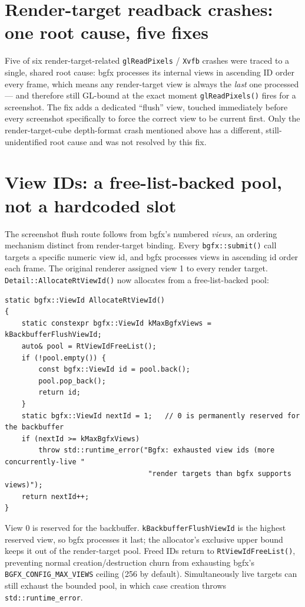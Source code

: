 \section{Render-target readback crashes: one root cause, five fixes}

Five of six render-target-related \texttt{glReadPixels} / \texttt{Xvfb} crashes were traced to
a single, shared root cause: bgfx processes its internal views in ascending ID order every
frame, which means any render-target view is always the \emph{last} one processed --- and
therefore still GL-bound at the exact moment \texttt{glReadPixels()} fires for a screenshot.
The fix adds a dedicated ``flush'' view, touched immediately before every screenshot
specifically to force the correct view to be current first. Only the render-target-cube
depth-format crash mentioned above has a different, still-unidentified root cause and was
not resolved by this fix.

\section{View IDs: a free-list-backed pool, not a hardcoded slot}
\label{sec:bgfx-view-ids}

The screenshot flush route follows from bgfx's numbered \emph{views}, an ordering mechanism
distinct from render-target binding. Every
\texttt{bgfx::submit()} call targets a specific numeric view id, and bgfx processes views in
ascending id order each frame. The original renderer assigned view 1 to every render target.
\texttt{Detail::AllocateRtViewId()} now allocates from a free-list-backed pool:

\begin{lstlisting}
static bgfx::ViewId AllocateRtViewId()
{
    static constexpr bgfx::ViewId kMaxBgfxViews = kBackbufferFlushViewId;
    auto& pool = RtViewIdFreeList();
    if (!pool.empty()) {
        const bgfx::ViewId id = pool.back();
        pool.pop_back();
        return id;
    }
    static bgfx::ViewId nextId = 1;   // 0 is permanently reserved for the backbuffer
    if (nextId >= kMaxBgfxViews)
        throw std::runtime_error("Bgfx: exhausted view ids (more concurrently-live "
                                  "render targets than bgfx supports views)");
    return nextId++;
}
\end{lstlisting}

View 0 is reserved for the backbuffer. \texttt{kBackbufferFlushViewId} is the highest reserved
view, so bgfx processes it last; the allocator's exclusive upper bound keeps it out of the
render-target pool. Freed IDs return to \texttt{RtViewIdFreeList()}, preventing normal
creation/destruction churn from exhausting bgfx's \texttt{BGFX\_CONFIG\_MAX\_VIEWS} ceiling
(256 by default). Simultaneously live targets can still exhaust the bounded pool, in which case
creation throws \texttt{std::runtime\_error}.

